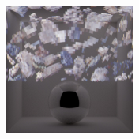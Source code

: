 \begin{figure}[]
\begin{subfigure}{\textwidth}
\begin{subfigure}{0.19\textwidth}
            \caption*{}
        \end{subfigure}
        \hfill
        \begin{subfigure}{0.19\textwidth}
            \centering
            \includegraphics[width=\textwidth]{images/04-experiment03/ball/pebbles/pixel_proj.jpg}
            \caption*{}
        \end{subfigure}
        

\end{subfigure}
\end{figure}
